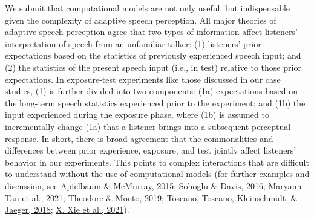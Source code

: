 \documentclass[
  11pt,
  english,
  man,floatsintext]{apa6}
\begin{document}
We submit that computational models are not only useful, but indispensable given the complexity of adaptive speech perception. All major theories of adaptive speech perception agree that two types of information affect listeners' interpretation of speech from an unfamiliar talker: (1) listeners' prior expectations based on the statistics of previously experienced speech input; and (2) the statistics of the present speech input (i.e., in test) relative to those prior expectations. In exposure-test experiments like those discussed in our case studies, (1) is further divided into two components: (1a) expectations based on the long-term speech statistics experienced prior to the experiment; and (1b) the input experienced during the exposure phase, where (1b) is assumed to incrementally change (1a) that a listener brings into a subsequent perceptual response. In short, there is broad agreement that the commonalities and differences between prior experience, exposure, and test jointly affect listeners' behavior in our experiments. This points to complex interactions that are difficult to understand without the use of computational models (for further examples and discussion, see \protect\hyperlink{ref-apfelbaum-mcmurray2015}{Apfelbaum \& McMurray, 2015}; \protect\hyperlink{ref-sohoglu-davis2016}{Sohoglu \& Davis, 2016}; \protect\hyperlink{ref-tan2021}{Maryann Tan et al., 2021}; \protect\hyperlink{ref-theodore-monto2019}{Theodore \& Monto, 2019}; \protect\hyperlink{ref-toscano2018}{Toscano, Toscano, Kleinschmidt, \& Jaeger, 2018}; \protect\hyperlink{ref-xie2021cognition}{X. Xie et al., 2021}).
\end{document}

